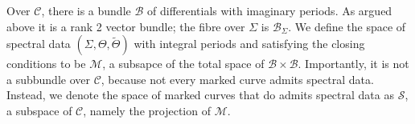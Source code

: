 Over $\mathcal{C}$, there is a bundle $\mathcal{B}$ of differentials with imaginary periods. As argued above it is a rank 2 vector bundle; the fibre over $Σ$ is $\mathcal{B}_Σ$. We define the space of spectral data $(Σ,Θ,\tilde{Θ})$ with integral periods and satisfying the closing conditions to be $\mathcal{M}$, a subsapce of the total space of $\mathcal{B}\times\mathcal{B}$. Importantly, it is not a subbundle over $\mathcal{C}$, because not every marked curve admits spectral data. Instead, we denote the space of marked curves that do admits spectral data as $\mathcal{S}$, a subspace of $\mathcal{C}$, namely the projection of $\mathcal{M}$.











\starttocentries
